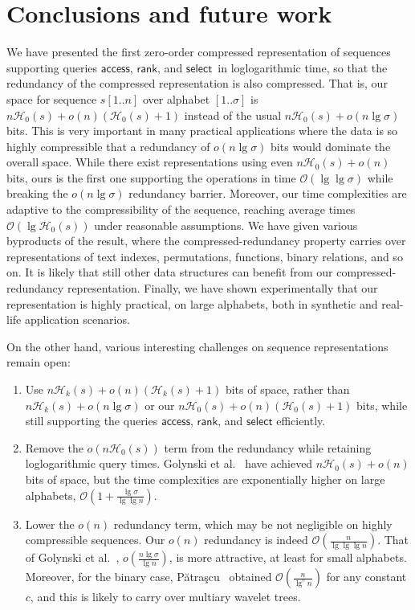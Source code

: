\documentclass[11pt]{article}
\newcommand{\Oh}[1]
    {\ensuremath{\mathcal{O}\left( {#1} \right)}}
\newcommand{\access}
    {\ensuremath{\mathsf{access}}}
\newcommand{\rank}
    {\ensuremath{\mathsf{rank}}}
\newcommand{\select}
    {\ensuremath{\mathsf{select}}}
\newcommand{\HH}{\mathcal{H}}
\newcommand{\Ho}{\HH_0}
\newcommand{\Hk}{\HH_k}
\begin{document}
\section{Conclusions and future work}

We have presented the first zero-order compressed representation of sequences
supporting queries \access, \rank, and \select\ in loglogarithmic time, so that 
the
redundancy of the compressed representation is also compressed. That is, our
space for sequence $s[1..n]$ over alphabet $[1..\sigma]$ is $n\Ho(s) +
o(n)(\Ho(s)+1)$ instead of the usual $n\Ho(s)+o(n\lg\sigma)$ bits.
This is very important in many practical applications where the data is so
highly compressible that a redundancy of $o(n\lg\sigma)$ bits would dominate 
the overall space. While there exist representations using even $n\Ho(s)+o(n)$ 
bits, ours is the first one supporting the operations in time
$\Oh{\lg\lg\sigma}$ while breaking the $o(n\lg\sigma)$ redundancy barrier.
Moreover, our time complexities are adaptive to the compressibility of the
sequence, reaching average times $\Oh{\lg \Ho(s)}$ under reasonable
assumptions. We have given various byproducts of the result, where the 
compressed-redundancy property carries over representations of text indexes,
permutations, functions, binary relations, and so on. It is likely that still 
other data structures can benefit from our compressed-redundancy representation.
Finally, we have shown experimentally that our representation is highly 
practical, on large alphabets, both in synthetic and real-life application 
scenarios.

\medskip

On the other hand, various interesting challenges on sequence representations
remain open:
\begin{enumerate}
\item Use $n\Hk(s)+o(n)(\Hk(s)+1)$ bits of space, rather than
$n\Hk(s)+o(n\lg \sigma)$ \cite{BHMR07,GOR10} or our
$n\Ho(s)+o(n)(\Ho(s)+1)$ bits, while still supporting the queries 
$\access$, $\rank$, and $\select$ efficiently. 
\item Remove the $o(n\Ho(s))$ term from the redundancy while retaining
loglogarithmic query times. Golynski et al.~\cite{GRR08} have achieved 
$n\Ho(s)+o(n)$ bits of space, but the time complexities are exponentially
higher on large alphabets, $\Oh{1+\frac{\lg\sigma}{\lg\lg n}}$.
\item Lower the $o(n)$ redundancy term, which may be not negligible on 
highly compressible sequences.
Our $o(n)$ redundancy is indeed $\Oh{\frac{n}{\lg\lg\lg n}}$.
That of Golynski et al.~\cite{GRR08}, $o\left(\frac{n\lg\sigma}{\lg n}\right)$,
is more attractive, at least for small alphabets. Moreover, for the binary 
case, P\u{a}tra\c{s}cu~\cite{Pat08} obtained $\Oh{\frac{n}{\lg^c n}}$ for any 
constant $c$, and this is likely to carry over multiary wavelet trees.
\end{enumerate}
\end{document}
